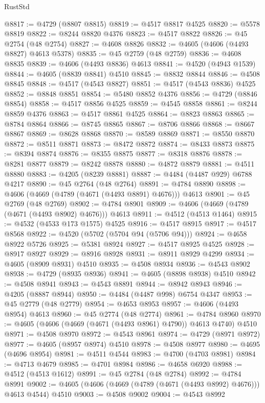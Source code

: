 \begin{lexlean}{RustStd}
\begin{coremodule}
@8817 := @4729 (@8807 @8815)
@8819 := @4517 @8817 @4525
@8820 := @5578 @8819
@8822 := @8244 @8820 @4376
@8823 := @4517 @8822
@8826 := @45 @2754 (@48 @2754)
@8827 := @4608 @8826
@8832 := @4605 (@4606 (@4493 @8827) @4613 @5378)
@8835 := @45 @2759 (@48 @2759)
@8836 := @4608 @8835
@8839 := @4606 (@4493 @8836) @4613
@8841 := @4520 (@4943 @1539)
@8844 := @4605 (@8839 @8841) @4510
@8845 := @8832 @8844
@8846 := @4508 @8845
@8848 := @4517 (@4543 @8827)
@8851 := @4517 (@4543 @8836) @4525
@8852 := @8848 @8851
@8854 := @5480 @8852 @4376
@8856 := @4729 (@8846 @8854)
@8858 := @4517 @8856 @4525
@8859 := @4545 @8858
@8861 := @8244 @8859 @4376
@8863 := @4517 @8861 @4525
@8864 := @8823 @8863
@8865 := @8784 @8864
@8866 := @8745 @8865
@8867 := @8706 @8866
@8868 := @8667 @8867
@8869 := @8628 @8868
@8870 := @8589 @8869
@8871 := @8550 @8870
@8872 := @8511 @8871
@8873 := @8472 @8872
@8874 := @8433 @8873
@8875 := @8394 @8874
@8876 := @8355 @8875
@8877 := @8318 @8876
@8878 := @8281 @8877
@8879 := @8242 @8878
@8880 := @4872 @8879
@8881 := @4511 @8880
@8883 := @4205 (@8239 @8881)
@8887 := @4484 (@4487 @929) @6788 @4217
@8890 := @45 @2764 (@48 @2764)
@8891 := @4784 @8890
@8898 := @4606 (@4669 (@4789 (@4671 (@4493 @8891) @4676))) @4613
@8901 := @45 @2769 (@48 @2769)
@8902 := @4784 @8901
@8909 := @4606 (@4669 (@4789 (@4671 (@4493 @8902) @4676))) @4613
@8911 := @4512 (@4513 @1464)
@8915 := @4532 (@4533 @173 @1575) @4525
@8916 := @4517 @8915
@8917 := @4517 @8568
@8922 := @4520 (@5702 (@5704 @94 (@5706 @94)))
@8924 := @4658 @8922 @5726
@8925 := @5381 @8924
@8927 := @4517 @8925 @4525
@8928 := @8917 @8927
@8929 := @8916 @8928
@8931 := @8911 @8929 @4299
@8934 := @4605 (@8909 @8931) @4510
@8935 := @4508 @8934
@8936 := @4543 @8902
@8938 := @4729 (@8935 @8936)
@8941 := @4605 (@8898 @8938) @4510
@8942 := @4508 @8941
@8943 := @4543 @8891
@8944 := @8942 @8943
@8946 := @4205 (@8887 @8944)
@8950 := @4484 (@4487 @998) @6754 @4347
@8953 := @45 @2779 (@48 @2779)
@8954 := @4653 @8953
@8957 := @4606 (@4493 @8954) @4613
@8960 := @45 @2774 (@48 @2774)
@8961 := @4784 @8960
@8970 := @4605 (@4606 (@4669 (@4671 (@4493 @8961) @4790)) @4613 @4740) @4510
@8971 := @4508 @8970
@8972 := @4543 @8961
@8974 := @4729 (@8971 @8972)
@8977 := @4605 (@8957 @8974) @4510
@8978 := @4508 @8977
@8980 := @4695 (@4696 @8954)
@8981 := @4511 @4544
@8983 := @4700 (@4703 @8981)
@8984 := @4713 @4679
@8985 := @4701 @8984
@8986 := @4658 @6920
@8988 := @4512 (@4513 @1612)
@8991 := @45 @2784 (@48 @2784)
@8992 := @4784 @8991
@9002 := @4605 (@4606 (@4669 (@4789 (@4671 (@4493 @8992) @4676))) @4613 @4544) @4510
@9003 := @4508 @9002
@9004 := @4543 @8992

\end{coremodule}
\end{lexlean}
